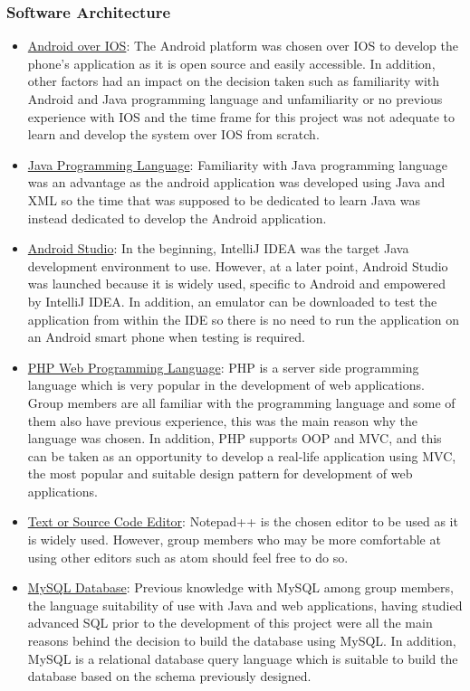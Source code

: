 \documentclass{article}
\begin{document}
\subsubsection{Software Architecture}
\begin{itemize}
\item \underline{Android over IOS}: The Android platform was chosen over IOS to develop the phone’s application as it is open source and easily accessible. In addition, other factors had an impact on the decision taken such as familiarity with Android and Java programming language and unfamiliarity or no previous experience with IOS and the time frame for this project was not adequate to learn and develop the system over IOS from scratch.
\item \underline{Java Programming Language}: Familiarity with Java programming language was an advantage as the android application was developed using Java and XML so the time that was supposed to be dedicated to learn Java was instead dedicated to develop the Android application. 
\item \underline{Android Studio}: In the beginning, IntelliJ IDEA was the target Java development environment to use. However, at a later point, Android Studio was launched because it is widely used, specific to Android and empowered by IntelliJ IDEA. In addition, an emulator can be downloaded to test the application from within the IDE so there is no need to run the application on an Android smart phone when testing is required. 
\item \underline{PHP Web Programming Language}: PHP is a server side programming language which is very popular in the development of web applications. Group members are all familiar with the programming language and some of them also have previous experience, this was the main reason why the language was chosen. In addition, PHP supports OOP and MVC, and this can be taken as an opportunity to develop a real-life application using MVC, the most popular and suitable design pattern for development of web applications.
\item \underline{Text or Source Code Editor}: Notepad++ is the chosen editor to be used as it is widely used. However, group members who may be more comfortable at using other editors such as atom should feel free to do so. 
\item \underline{MySQL Database}: Previous knowledge with MySQL among group members, the language suitability of use with Java and web applications, having studied advanced SQL prior to the development of this project were all the main reasons behind the decision to build the database using MySQL. In addition, MySQL is a relational database query language which is suitable to build the database based on the schema previously designed. 

\end{itemize}
\end{document}

